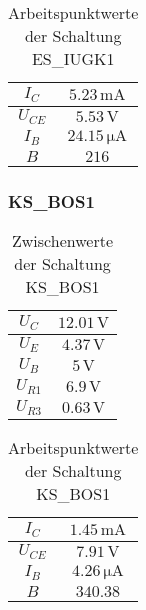 \begin{table}[H]
\begin{center}
\begin{tabular}{c | c}
  $I_C$ & $5.23 \, \si{\milli\ampere}$\\
  \hline
  $U_{CE}$ & $5.53 \, \si{\volt}$\\
  \hline
  $I_{B}$ & $24.15 \, \si{\micro\ampere}$\\
  \hline
  $B$ & $216 $\\
\end{tabular}
\caption{Arbeitspunktwerte der Schaltung ES\_IUGK1}
\end{center}
\end{table}

\subsubsection{KS\_BOS1}

\begin{table}[H]
\begin{center}
\begin{tabular}{c | c}
  $U_C$ & $12.01 \, \si{\volt}$\\
  \hline
  $U_E$ & $4.37 \, \si{\volt}$\\
  \hline
  $U_B$ & $5 \, \si{\volt}$\\
  \hline
  $U_{R1}$ & $6.9 \, \si{\volt}$\\
  \hline
  $U_{R3}$ & $0.63 \, \si{\volt}$\\
\end{tabular}
\end{center}
\caption{Zwischenwerte der Schaltung KS\_BOS1}
\end{table}

\begin{table}[H]
\begin{center}
\begin{tabular}{c | c}
  $I_C$ & $ 1.45 \, \si{\milli\ampere}$\\
  \hline
  $U_{CE}$ & $ 7.91 \, \si{\volt}$\\
  \hline
  $I_{B}$ & $ 4.26 \, \si{\micro\ampere}$\\
  \hline
  $B$ & $340.38$\\
\end{tabular}
\caption{Arbeitspunktwerte der Schaltung KS\_BOS1}
\end{center}
\end{table}


